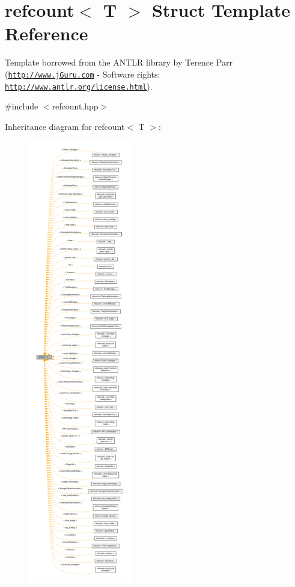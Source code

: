 \hypertarget{structrefcount}{}\section{refcount$<$ T $>$ Struct Template Reference}
\label{structrefcount}


Template borrowed from the A\+N\+T\+LR library by Terence Parr (\href{http://www.jGuru.com}{\tt http\+://www.\+j\+Guru.\+com} -\/ Software rights\+: \href{http://www.antlr.org/license.html}{\tt http\+://www.\+antlr.\+org/license.\+html}).  




{\ttfamily \#include $<$refcount.\+hpp$>$}



Inheritance diagram for refcount$<$ T $>$\+:
\nopagebreak
\begin{figure}[H]
\begin{center}
\leavevmode
\includegraphics[height=550pt]{dd/d49/structrefcount__inherit__graph}
\end{center}
\end{figure}


